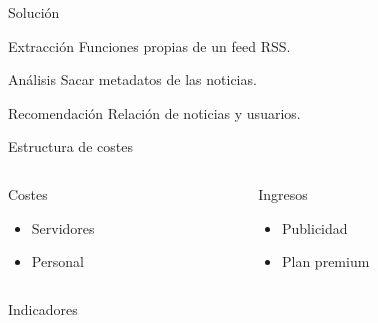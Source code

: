 \documentclass[12pt]{beamer}
\begin{document}

		\begin{frame}{Solución}
			\begin{block}{Extracción}
				Funciones propias de un feed RSS.
			\end{block}
			\begin{block}{Análisis}
				Sacar metadatos de las noticias.
			\end{block}
			\begin{block}{Recomendación}
				Relación de noticias y usuarios.
			\end{block}
		\end{frame}
		

		\begin{frame}{Estructura de costes}
			\begin{columns}[onlytextwidth]
				\begin{column}{0.45\textwidth}
					\begin{block}{Costes}
						\begin{itemize}
							\item Servidores
							\item Personal
						\end{itemize}
					\end{block}
				\end{column}
				\begin{column}{0.45\textwidth}
					\begin{block}{Ingresos}
						\begin{itemize}
							\item Publicidad
							\item Plan premium
						\end{itemize}
					\end{block}
				\end{column}
			\end{columns}
		\end{frame}
		

		\begin{frame}{Indicadores}
			\begin{center}
			\end{center}
        \end{frame}
        
\end{document}
